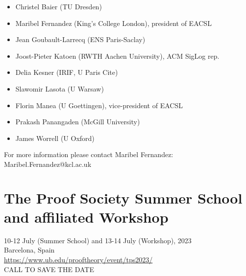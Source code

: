 \documentclass[prodmode,acmtecs]{acmsmall} %
\begin{document}
\begin{itemize}
\begin{itemize}\item  Christel Baier (TU Dresden)
\item  Maribel Fernandez (King’s College London), president of EACSL
\item  Jean Goubault-Larrecq (ENS Paris-Saclay)
\item  Joost-Pieter Katoen (RWTH Aachen University), ACM SigLog rep.
\item  Delia Kesner (IRIF, U Paris Cite)
\item  Slawomir Lasota (U Warsaw)
\item  Florin Manea (U Goettingen), vice-president of EACSL
\item  Prakash Panangaden (McGill University)
\item  James Worrell (U Oxford)
\end{itemize} 
  For more information please contact Maribel Fernandez: Maribel.Fernandez@kcl.ac.uk 
 
\end{itemize}\section{The Proof Society Summer School and affiliated Workshop}\label{TheProofSocietySummerSchoolandaffiliatedWorkshop}  10-12 July (Summer School) and 13-14 July (Workshop), 2023\\ 
  Barcelona, Spain\\ 
  \href{https://www.ub.edu/prooftheory/event/tps2023/}{https://www.ub.edu/prooftheory/event/tps2023/}\\ 
CALL TO SAVE THE DATE 
\end{document}
